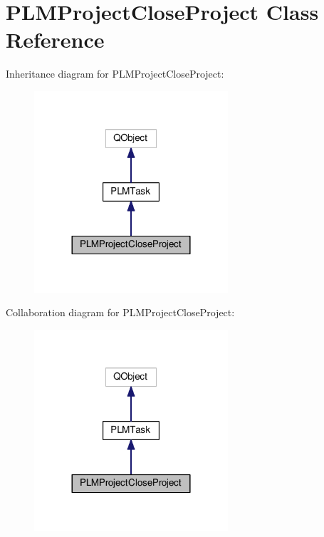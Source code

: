 \hypertarget{class_p_l_m_project_close_project}{}\section{P\+L\+M\+Project\+Close\+Project Class Reference}
\label{class_p_l_m_project_close_project}


Inheritance diagram for P\+L\+M\+Project\+Close\+Project\+:\nopagebreak
\begin{figure}[H]
\begin{center}
\leavevmode
\includegraphics[width=204pt]{class_p_l_m_project_close_project__inherit__graph}
\end{center}
\end{figure}


Collaboration diagram for P\+L\+M\+Project\+Close\+Project\+:\nopagebreak
\begin{figure}[H]
\begin{center}
\leavevmode
\includegraphics[width=204pt]{class_p_l_m_project_close_project__coll__graph}
\end{center}
\end{figure}
